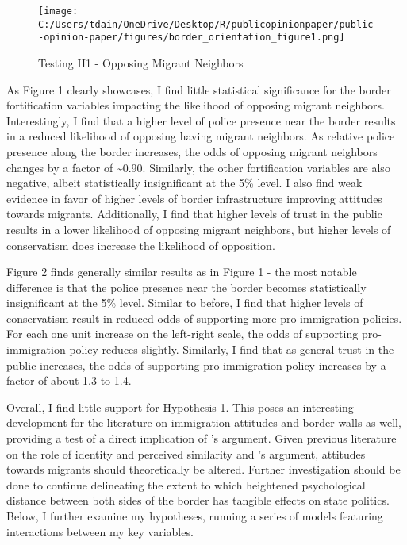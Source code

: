 \documentclass[12pt,]{article}
\begin{document}
\begin{figure}
\centering
\texttt{[image: C:/Users/tdain/OneDrive/Desktop/R/publicopinionpaper/public-opinion-paper/figures/border\_orientation\_figure1.png]}
\caption{Testing H1 - Opposing Migrant Neighbors}
\end{figure}

As Figure 1 clearly showcases, I find little statistical significance
for the border fortification variables impacting the likelihood of
opposing migrant neighbors. Interestingly, I find that a higher level of
police presence near the border results in a reduced likelihood of
opposing having migrant neighbors. As relative police presence along the
border increases, the odds of opposing migrant neighbors changes by a
factor of \textasciitilde0.90. Similarly, the other fortification
variables are also negative, albeit statistically insignificant at the
5\% level. I also find weak evidence in favor of higher levels of border
infrastructure improving attitudes towards migrants. Additionally, I
find that higher levels of trust in the public results in a lower
likelihood of opposing migrant neighbors, but higher levels of
conservatism does increase the likelihood of opposition.

Figure 2 finds generally similar results as in Figure 1 - the most
notable difference is that the police presence near the border becomes
statistically insignificant at the 5\% level. Similar to before, I find
that higher levels of conservatism result in reduced odds of supporting
more pro-immigration policies. For each one unit increase on the
left-right scale, the odds of supporting pro-immigration policy reduces
slightly. Similarly, I find that as general trust in the public
increases, the odds of supporting pro-immigration policy increases by a
factor of about 1.3 to 1.4.

Overall, I find little support for Hypothesis 1. This poses an
interesting development for the literature on immigration attitudes and
border walls as well, providing a test of a direct implication of
\citet{mutz2022}'s argument. Given previous literature on the role of
identity and perceived similarity and \citet{mutz2022}'s argument,
attitudes towards migrants should theoretically be altered. Further
investigation should be done to continue delineating the extent to which
heightened psychological distance between both sides of the border has
tangible effects on state politics. Below, I further examine my
hypotheses, running a series of models featuring interactions between my
key variables.
\end{document}
